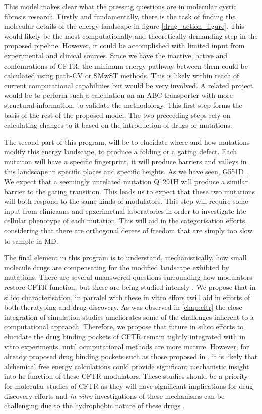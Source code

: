 This model makes clear what the pressing questions are in molecular cystic fibrosis research. Firstly and fundamentally, there is the task of finding the molecular details of the energy landscape in figure \ref{drug_action_figure}.  This would likely be the most computationally and theoretically demanding step in the proposed pipeline. However, it could be accomplished with limited input from experimental and clinical sources. Since we have the inactive, active and confomrations of CFTR, the minimum energy pathway between them could be calculated using path-CV or SMwST methods. This is likely within reach of current computational capabilities but would be very involved. A related project would be to perform such a calculation on an ABC transporter with more structural information, to validate the methodology. This first step forms the basis of the rest of the proposed model. The two preceeding steps rely on calculating changes to it based on the introduction of drugs or mutations.

The second part of this program, will be to elucidate where and how mutations modify this energy landscape, to produce a folding or a gating defect. Each mutaiton will have a specific fingerprint, it will produce barriers and valleys in this landscape in specific places and specific heights. As we have seen, G551D . We expect that a seemingly unrelated mutation Q1291H will produce a similar barrier to the gating transition. This leads us to expect that these two mutations will both respond to the same kinds of modulators. This step will require some input from clinicaans and epxerimetnal laboratories in order to investigate hte cellular phenotype of each mutation. This will aid in the categorisation efforts, considering that there are orthogonal derees of freedom that are simply too slow to sample in MD.

The final element in this program is to understand, mechanistically, how small molecule drugs are compensating for the modified landscape exhibted by mutations. There are several unanswered questions surrounding how modulators restore CFTR function, but these are being studied intensly \cite{}. We propose that in silico characterisation, in parralel with these in vitro effors twill aid in efforts of both theratyping and drug discovery. As was observed in \ref{chap:cftr} the close integration of simulation studies ameliorates some of the challenges inherent to a computational appraoch. Therefore, we propose that future in silico efforts to elucidate the drug binding pockets of CFTR remain tightly integrated with in vitro experiments, until ocmputational methods are more mature. However, for already proposed drug binding pockets such as those proposed in \cite{}, it is likely that alchemical free energy calculations could provide significant mechanistic insight into he function of these CFTR modulators. These studies should be a priority for molecular studies of CFTR as they will have significant implications for drug discovery efforts and \textit{in vitro} investigations of these mechanisms can be challenging due to the hydrophobic nature of these drugs \cite{csanady2019}. 


